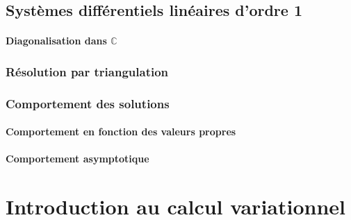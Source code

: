 \section{Systèmes différentiels linéaires d'ordre 1}

\subsubsection{Diagonalisation dans $\mathbb{C}$}
\subsection{Résolution par triangulation}
\subsection{Comportement des solutions}
\subsubsection{Comportement en fonction des valeurs propres}
\subsubsection{Comportement asymptotique}
\chapter{Introduction au calcul variationnel}